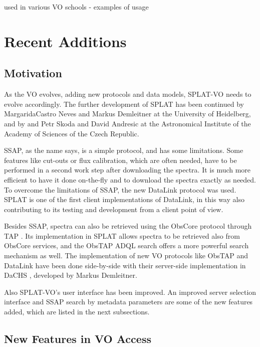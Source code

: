 \documentclass[final,authoryear,5p,times,twocolumn]{elsarticle}
\begin{document}
used in various VO schools - examples of usage




\section{Recent Additions}


\subsection{Motivation}

As the VO evolves, adding new protocols and data models, SPLAT-VO
needs to evolve accordingly.  The further development of SPLAT has
been continued by MargaridaCastro Neves and Markus Demleitner at the
University of Heidelberg, and by and Petr Skoda and David Andresic at
the Astronomical Institute of the Academy of Sciences of the Czech
Republic.

SSAP, as the name says, is a simple protocol, and has some
limitations. Some features like cut-outs or flux calibration, which
are often needed, have to be performed in a second work step after
downloading the spectra. It is much more efficient to have it done
on-the-fly and  to download the spectra exactly as needed. To overcome
the limitations of SSAP, the new DataLink protocol \citep{datalink}
was used. SPLAT is one of the first client implementations of
DataLink, in this way also contributing to its testing and development
from a client point of view.

Besides SSAP, spectra can also be retrieved using the ObsCore protocol
through TAP \citep[known as ObsTap;][]{obstap}. Its implementation in
SPLAT allows spectra to be retrieved also from ObsCore services, and
the ObsTAP ADQL \citep{adql} search offers a more powerful search
mechanism as well. The implementation of new VO protocols like ObsTAP
and DataLink have been done side-by-side with their server-side
implementation in DaCHS \citep[Data Center Helper Suite;][]{dachs},
developed by Markus Demleitner.

Also SPLAT-VO's user interface has been improved. An improved server
selection interface and SSAP search by metadata parameters are some of
the new features added, which are listed in the next subsections.

\subsection{New Features in VO Access}
\end{document}
